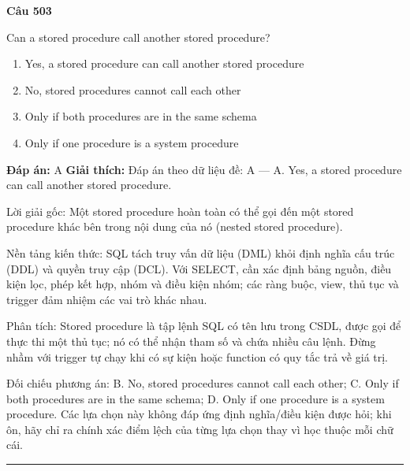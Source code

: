 \documentclass[11pt,a4paper]{article}
\newenvironment{question}[1]{%
  \par\vspace{1em}\noindent\textbf{\large Câu #1}\par\vspace{0.4em}
}{%
  \par\vspace{1em}\hrule\vspace{0.6em}
}
\newenvironment{choices}{%
  \begin{enumerate}[label=\textbf{\Alph*.},leftmargin=2.2em,itemsep=2pt,topsep=3pt]
}{%
  \end{enumerate}
}
\newcommand{\choice}{\item}
\begin{document}
\begin{question}{503}
Can a stored procedure call another stored procedure?
\begin{choices}
\choice Yes, a stored procedure can call another stored procedure
\choice No, stored procedures cannot call each other
\choice Only if both procedures are in the same schema
\choice Only if one procedure is a system procedure
\end{choices}
\textbf{Đáp án:} A
\textbf{Giải thích:} Đáp án theo dữ liệu đề: A — A. Yes, a stored procedure can call another stored procedure.

Lời giải gốc: Một stored procedure hoàn toàn có thể gọi đến một stored procedure khác bên trong nội dung của nó (nested stored procedure).

Nền tảng kiến thức: SQL tách truy vấn dữ liệu (DML) khỏi định nghĩa cấu trúc (DDL) và quyền truy cập (DCL). Với SELECT, cần xác định bảng nguồn, điều kiện lọc, phép kết hợp, nhóm và điều kiện nhóm; các ràng buộc, view, thủ tục và trigger đảm nhiệm các vai trò khác nhau.

Phân tích: Stored procedure là tập lệnh SQL có tên lưu trong CSDL, được gọi để thực thi một thủ tục; nó có thể nhận tham số và chứa nhiều câu lệnh. Đừng nhầm với trigger tự chạy khi có sự kiện hoặc function có quy tắc trả về giá trị.

Đối chiếu phương án: B. No, stored procedures cannot call each other; C. Only if both procedures are in the same schema; D. Only if one procedure is a system procedure. Các lựa chọn này không đáp ứng định nghĩa/điều kiện được hỏi; khi ôn, hãy chỉ ra chính xác điểm lệch của từng lựa chọn thay vì học thuộc mỗi chữ cái.
\end{question}
\end{document}
